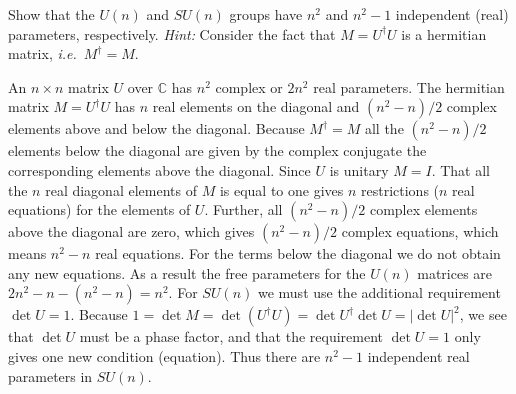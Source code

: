 \documentclass[notes.tex]{subfiles}
\begin{document}
\begin{Exercise}[label=ex:Un_parameters]
Show that the $U(n)$ and $SU(n)$ groups have $n^2$ and $n^2-1$ independent (real) parameters, respectively. {\it Hint:} Consider the fact that $M=U^\dagger U$ is a hermitian matrix, {\it i.e.}\ $M^\dagger=M$.
\end{Exercise}
\begin{Answer}
An $n\times n$ matrix $U$ over $\mathbb C$ has $n^2$ complex or $2n^2$ real parameters. The hermitian matrix $M=U^\dagger U$ has $n$ real elements on the diagonal
and $(n^2-n)/2$ complex elements above and below the diagonal. Because $M^\dagger=M$ all the $(n^2-n)/2$ elements below the diagonal are given by the complex conjugate the corresponding elements above the diagonal. Since $U$ is unitary $M=I$. That all the $n$ real diagonal elements of $M$ is equal to one gives $n$ restrictions ($n$ real equations) for the elements of $U$. Further, all $(n^2-n)/2$ complex elements above the diagonal are zero, which gives $(n^2-n)/2$ complex equations, which means $n^2-n$ real equations. For the terms below the diagonal we do not obtain any new equations. As a result the free parameters for the $U(n)$ matrices are $2n^2-n-(n^2-n)=n^2$.
For $SU(n)$ we must use the additional requirement $\det U=1$. Because $1=\det M=\det (U^\dagger U)=\det U^\dagger \det U=|\det U|^2$, we see that $\det U$ must be a phase factor, and that the requirement $\det U=1$ only gives one new condition (equation). Thus there are $n^2-1$ independent real parameters in $SU(n)$.
\end{Answer}
\end{document}
